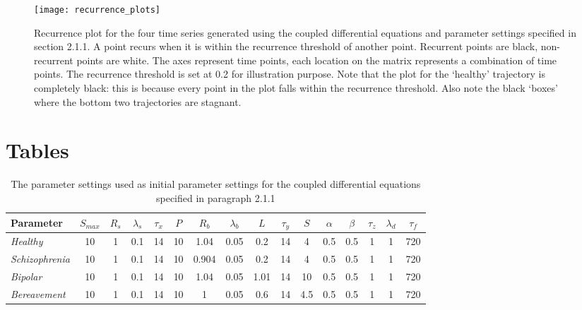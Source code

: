 \documentclass[utf8]{FrontiersinVancouver}
\begin{document}
\newpage
\begin{figure}[H]
    \begin{center}
    \texttt{[image: recurrence\_plots]}
    \end{center}
    \caption{Recurrence plot for the four time series generated using the coupled differential equations and parameter settings specified in section 2.1.1. A point recurs when it is within the recurrence threshold of another point. Recurrent points are black, non-recurrent points are white. The axes represent time points, each location on the matrix represents a combination of time points. The recurrence threshold is set at 0.2 for illustration purpose. Note that the plot for the `healthy' trajectory is completely black: this is because every point in the plot falls within the recurrence threshold. Also note the black `boxes' where the bottom two trajectories are stagnant.}\label{fig:2}
    \end{figure}

\newpage
\section*{Tables}
\begin{table}[H]
    \begin{tabular}{|l| c c c c c c c c c c c c c c c|}
    \hline
    \bf{Parameter} & $S_{max}$ & $R_{s}$ & $\lambda_{s}$ & $\tau_{x}$ & $P$ & $R_{b}$ & $\lambda_{b}$ & $L$ & $\tau_{y}$ & $S$ & $\alpha$ & $\beta$ & $\tau_{z}$ & $\lambda_{d}$ & $\tau_{f}$ \\
    \hline
    \it{Healthy} & 10 & 1 & 0.1 & 14 & 10 & 1.04 & 0.05 & 0.2 & 14 & 4 & 0.5 & 0.5 & 1 & 1 & 720 \\
    \hline
    \it{Schizophrenia} & 10 & 1 & 0.1 & 14 & 10 & 0.904 & 0.05 & 0.2 & 14 & 4 & 0.5 & 0.5 & 1 & 1 & 720 \\
    \hline
    \it{Bipolar} & 10 & 1 & 0.1 & 14 & 10 & 1.04 & 0.05 & 1.01 & 14 & 10 & 0.5 & 0.5 & 1 & 1 & 720 \\
    \hline
    \it{Bereavement} & 10 & 1 & 0.1 & 14 & 10 & 1 & 0.05 & 0.6 & 14 & 4.5 & 0.5 & 0.5 & 1 & 1 & 720 \\
    \hline
    \end{tabular}
    \caption{The parameter settings used as initial parameter settings for the coupled differential equations specified in paragraph 2.1.1}\label{tab:1}
    \end{table}



    
\end{document}
